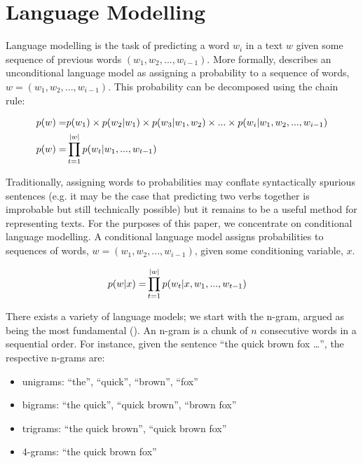 \documentclass[12pt,twoside]{report}
\begin{document}
\section{Language Modelling}


Language modelling is the task of predicting a word $w_i$ in a text $w$ given some sequence of previous words $(w_1, w_2, ..., w_{i-1})$. More formally, \cite{dyer_conditional_2017} describes an unconditional language model as assigning a probability to a sequence of words,  $w = (w_1, w_2, ..., w_{i-1})$. This probability can be decomposed using the chain rule:

\begin{align}
p(w) =& \space p(w_1) \times p(w_2|w_1) \times p(w_3|w_1, w_2) \times ... \times p(w_i|w_1, w_2, ..., w_{i-1}) \\
p(w) =& \prod^{|w|}_{t=1}p(w_t|w_1, ..., w_{t-1})
\end{align}

Traditionally, assigning words to probabilities may conflate syntactically spurious sentences (e.g. it may be the case that predicting two verbs together is improbable but still technically possible) but it remains to be a useful method for representing texts. For the purposes of this paper, we concentrate on conditional language modelling. A conditional language model assigns probabilities to sequences of words, $w = (w_1, w_2, ..., w_{i-1})$, given some conditioning variable, $x$. 

\begin{align}
	p(\boldmath{w}|x) = &{} \prod^{|w|}_{t=1}p(w_t|x,w_1, ..., w_{t-1})
\end{align}

There exists a variety of language models; we start with the n-gram, argued as being the most fundamental (\cite{le_recurrent_2018}). An n-gram is a chunk of $n$ consecutive words in a sequential order. For instance, given the sentence ``the quick brown fox \ldots'', the respective n-grams are: 

\begin{itemize}  
	\item unigrams: ``the'', ``quick'', ``brown'', ``fox''
	\item bigrams: ``the quick'', ``quick brown'', ``brown fox''
	\item trigrams: ``the quick brown'', ``quick brown fox''
	\item 4-grams: ``the quick brown fox''
\end{itemize}
\end{document}
